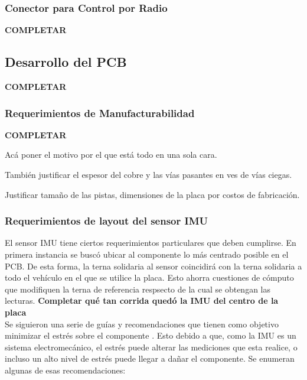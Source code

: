 \subsubsection{Conector para Control por Radio}

\textbf{{\color{red} COMPLETAR}}

\subsection{Desarrollo del PCB}

\textbf{{\color{red} COMPLETAR}}

\subsubsection{Requerimientos de Manufacturabilidad}

\textbf{{\color{red} COMPLETAR}}

Acá poner el motivo por el que está todo en una sola cara.

También justificar el espesor del cobre y las vías pasantes en ves de vías ciegas.

Justificar tamaño de las pistas, dimensiones de la placa por costos de fabricación.

\subsubsection{Requerimientos de layout del sensor IMU}

El sensor IMU tiene ciertos requerimientos particulares que deben cumplirse. En primera instancia se buscó ubicar al componente lo más centrado posible en el PCB. De esta forma, la terna solidaria al sensor coincidirá con la terna solidaria a todo el vehículo en el que se utilice la placa. Esto ahorra cuestiones de cómputo que modifiquen la terna de referencia respsecto de la cual se obtengan las lecturas. \textbf{{\color{red} Completar qué tan corrida quedó la IMU del centro de la placa}}\\

Se siguieron una serie de guías y recomendaciones que tienen como objetivo minimizar el estrés sobre el componente \cite{IMUpcb_1} \cite{IMUpcb_2} \cite{IMUpcb_3}. Esto debido a que, como la IMU es un sistema electromecánico, el estrés puede alterar las mediciones que esta realice, o incluso un alto nivel de estrés puede llegar a dañar el componente. Se enumeran algunas de esas recomendaciones:

